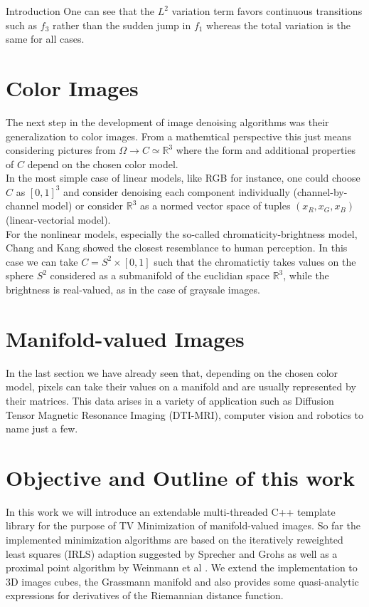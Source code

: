 \begin{chapter}{Introduction}
One can see that the $L^2$ variation term favors continuous transitions such as $f_3$ rather than the sudden jump in $f_1$ whereas the total variation is the same for
all cases.

\section{Color Images}
The next step in the development of image denoising algorithms was their generalization to color images. From a mathemtical perspective this just means considering pictures
from $\Omega\to C\simeq \mathbb{R}^3$ where the form and additional properties of $C$ depend on the chosen color model. \\
In the most simple case of linear models, like RGB for instance, one could choose $C$ as $[0,1]^3$ and consider denoising each component individually (channel-by-channel model)
or consider $\mathbb{R}^3$ as a normed vector space of tuples $(x_R, x_G, x_B)$ (linear-vectorial model).\\
For the nonlinear models, especially the so-called chromaticity-brightness model, Chang and Kang \cite{ChangKuang} showed the closest resemblance to human perception.
In this case we can take $C=S^2\times [0,1]$ such that the chromatictiy takes values on the sphere $S^2$ considered as a submanifold of the euclidian space $\mathbb{R}^3$, 
while the brightness is real-valued, as in the case of graysale images.

\section{Manifold-valued Images} %
\label{sec:Manifold-valued Images}
In the last section we have already seen that, depending on the chosen color model, pixels can take their values on a manifold and are usually represented by their matrices.
This data arises in a variety of application such as Diffusion Tensor Magnetic Resonance Imaging (DTI-MRI), computer vision and robotics to name just a few.

\section{Objective and Outline of this work}
In this work we will introduce an extendable multi-threaded C++ template library for the purpose of TV Minimization of manifold-valued images. 
So far the implemented minimization algorithms are based on the iteratively reweighted least squares (IRLS) adaption suggested by Sprecher and Grohs \cite{SprecherIRLS} as well as a 
proximal point algorithm by Weinmann et al \cite{WeinmannPRPT}. We extend the implementation to 3D images cubes, the Grassmann manifold and also provides some quasi-analytic expressions
for derivatives of the Riemannian distance function.\\


\end{chapter}
